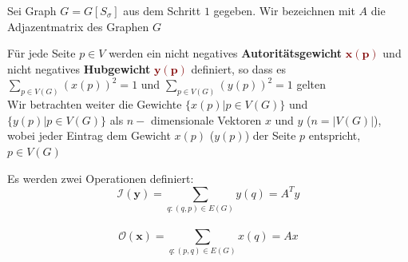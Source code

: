 \documentclass[hyperref={pdfpagelabels=false}]{beamer}
\begin{document}
\begin{frame}
\fontsize{10pt}{7.2}\selectfont
Sei Graph $G=G[S_\sigma]$ aus dem Schritt $1$ gegeben. Wir bezeichnen mit $A$ die Adjazentmatrix des Graphen $G$

\vspace{5pt}
Für jede Seite $p\in V$ werden ein nicht negatives {\bf Autoritätsgewicht} \textcolor{maroon}{$\mathbf{x(p)}$} und nicht negatives {\bf Hubgewicht} \textcolor{maroon}{$\mathbf{y(p)}$} definiert, so dass es $\sum_{p\in V(G)} (x(p))^2= 1$ und $\sum_{p\in V(G)} (y(p))^2 = 1$ gelten\\

\vspace{5pt}
Wir betrachten weiter die Gewichte $\{x(p)|p\in V(G)\}$ und $\{y(p)|p\in V(G)\}$ als $n-$ dimensionale Vektoren $x$ und $y$ ($n = |V(G)|$), wobei jeder Eintrag dem Gewicht $x(p)$ ($y(p)$) der Seite $p$ entspricht, $p\in V(G)$
\vspace{10pt}

Es werden zwei Operationen definiert:\\
	$$\mathbf{\mathcal{I}(y)} = \sum_{q:(q,p)\in E(G)}y(q) = A^Ty$$\\
	$$\mathbf{\mathcal{O}(x)} = \sum_{q:(p,q)\in E(G)}x(q) = Ax$$

\end{frame}
\end{document}
